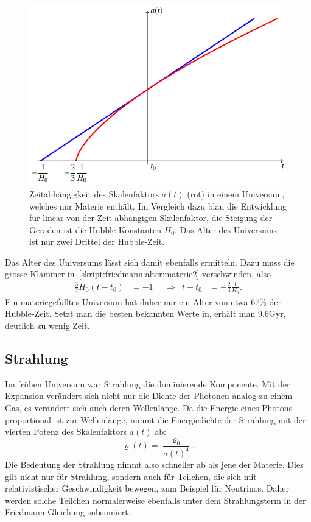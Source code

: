 \begin{figure}
\centering
\includegraphics{chapters/tikz/friedmann-materie.pdf}
\caption{Zeitabhängigkeit des Skalenfaktors $a(t)$ ({\color{red}rot})
in einem Universum, welches nur Materie enthält.
Im Vergleich dazu {\color{blue}blau} die Entwicklung für linear von der
Zeit abhängigen Skalenfaktor, die Steigung der Geraden ist die
Hubble-Konstanten $H_0$.
Das Alter des Universums ist nur zwei Drittel der Hubble-Zeit.
\label{skript:friedmann:graph:materie}}
\end{figure}

Das Alter des Universums lässt sich damit ebenfalls ermitteln.
Dazu muss die grosse Klammer in~\eqref{skript:friedmann:alter:materie2}
verschwinden, also
\begin{equation}
\begin{aligned}
\frac32H_0(t-t_0)
&=
-1
&&\Rightarrow&
t-t_0
&=
-\frac23 \frac1{H_0}.
\end{aligned}
\label{skript:friedman:23h0}
\end{equation}
Ein materiegefülltes Universum hat daher nur ein Alter von
etwa 67\% der Hubble-Zeit. 
Setzt man die besten bekannten Werte in, erhält man 9.6Gyr,
deutlich zu wenig Zeit.

\subsection{Strahlung}
Im frühen Universum war Strahlung die dominierende Komponente.
Mit der Expansion verändert sich nicht nur die Dichte der Photonen 
analog zu einem Gas, es verändert sich auch deren Wellenlänge.
Da die Energie eines Photons proportional ist zur Wellenlänge,
nimmt die Energiedichte der Strahlung mit der vierten Potenz des
Skalenfaktors $a(t)$ ab:
\[
\varrho(t)=\frac{\varrho_0}{a(t)^4}.
\]
Die Bedeutung der Strahlung nimmt also schneller ab als jene der Materie.
Dies gilt nicht nur für Strahlung, sondern auch für Teilchen, die
sich mit relativistischer Geschwindigkeit bewegen, zum Beispiel für
Neutrinos.
Daher werden solche Teilchen normalerweise ebenfalls unter dem
Strahlungsterm in der Friedmann-Gleichung subsumiert.

